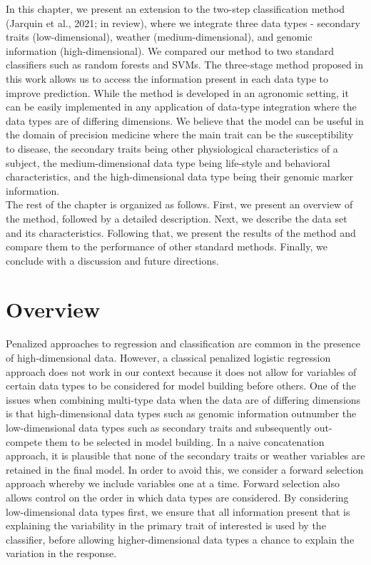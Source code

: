 In this chapter, we present an extension to the two-step classification method (Jarquin et al., 2021; in review), where we integrate three data types - secondary traits (low-dimensional), weather (medium-dimensional), and genomic information (high-dimensional). We compared our method to two standard classifiers such as random forests and SVMs. The three-stage method proposed in this work allows us to access the information present in each data type to improve prediction. While the method is developed in an agronomic setting, it can be easily implemented in any application of data-type integration where the data types are of differing dimensions. We believe that the model can be useful in the domain of precision medicine where the main trait can be the susceptibility to disease, the secondary traits being other physiological characteristics of a subject, the medium-dimensional data type being life-style and behavioral characteristics, and the high-dimensional data type being their genomic marker information. \\


The rest of the chapter is organized as follows. First, we present an overview of the method, followed by a detailed description. Next, we describe the data set and its characteristics. Following that, we present the results of the method and compare them to the performance of other standard methods. Finally, we conclude with a discussion and future directions. \\

\section{Overview}

Penalized approaches to regression and classification are common in the presence of high-dimensional data. However, a classical penalized logistic regression approach does not work in our context because it does not allow for variables of certain data types to be considered for model building before others. One of the issues when combining multi-type data when the data are of differing dimensions is that high-dimensional data types such as genomic information outnumber the low-dimensional data types such as secondary traits and subsequently out-compete them to be selected in model building. In a naive concatenation approach, it is plausible that none of the secondary traits or weather variables are retained in the final model. In order to avoid this, we consider a forward selection approach whereby we include variables one at a time. Forward selection also allows control on the order in which data types are considered. By considering low-dimensional data types first, we ensure that all information present that is explaining the variability in the primary trait of interested is used by the classifier, before allowing higher-dimensional data types a chance to explain the variation in the response. \\

